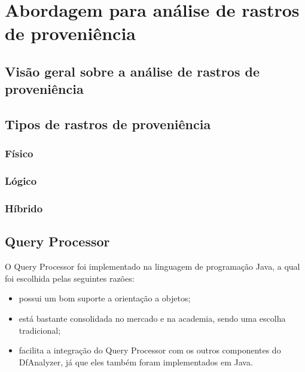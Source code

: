 
\chapter{Abordagem para análise de rastros de proveniência}%
\label{chap:rastros-de-proveniencia}


\section{Visão geral sobre a análise de rastros de proveniência}

 
\section{Tipos de rastros de proveniência}%
\label{sec:tipos-de-rastros-de-proveniencia}


\subsection{Físico}

\subsection{Lógico}

\subsection{Híbrido}


\section{Query Processor}

O Query Processor foi implementado na linguagem de programação Java, a qual foi escolhida pelas seguintes razões:

\begin{itemize}
    \item possui um bom suporte a orientação a objetos;
    \item está bastante consolidada no mercado e na academia, sendo uma escolha tradicional;
    \item facilita a integração do Query Processor com os outros componentes do DfAnalyzer, já que eles também foram implementados em Java.
\end{itemize}

